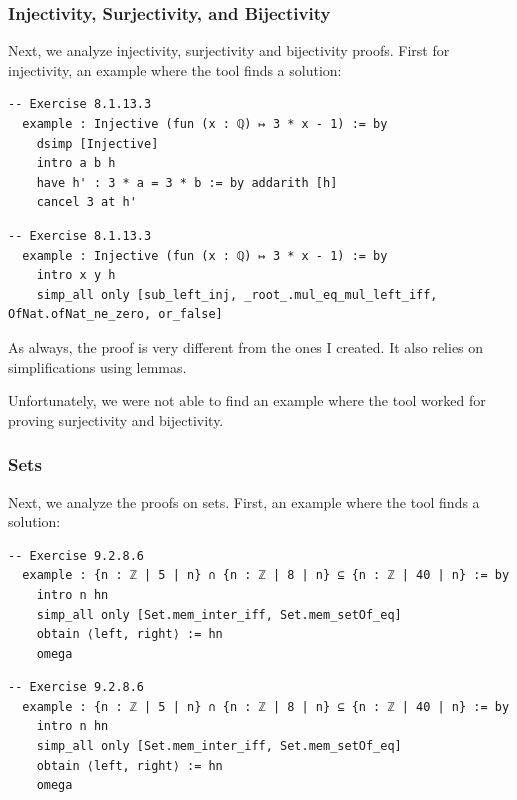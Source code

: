 \documentclass[12pt]{article}
\newcommand{\leancopilot}{\texttt{LeanCopilot} }
\begin{document}
\subsubsection{Injectivity, Surjectivity, and Bijectivity}
Next, we analyze injectivity, surjectivity and bijectivity proofs. First for injectivity, an example where the tool finds a solution:

\begin{minipage}{0.495\textwidth}
  \begin{lstlisting}[title={Human proof}]
  -- Exercise 8.1.13.3    
  example : Injective (fun (x : ℚ) ↦ 3 * x - 1) := by
    dsimp [Injective]
    intro a b h
    have h' : 3 * a = 3 * b := by addarith [h]
    cancel 3 at h'
  \end{lstlisting}
\end{minipage}
\vline
\begin{minipage}{0.495\textwidth}
  \begin{lstlisting}[title={\leancopilot proof}]
  -- Exercise 8.1.13.3 
  example : Injective (fun (x : ℚ) ↦ 3 * x - 1) := by
    intro x y h
    simp_all only [sub_left_inj, _root_.mul_eq_mul_left_iff, OfNat.ofNat_ne_zero, or_false]
  \end{lstlisting}
\end{minipage}

As always, the proof is very different from the ones I created. It also relies on simplifications using lemmas.

Unfortunately, we were not able to find an example where the tool worked for proving surjectivity and bijectivity. 

\subsubsection{Sets}
Next, we analyze the proofs on sets. First, an example where the tool finds a solution:

\begin{minipage}{0.495\textwidth}
  \begin{lstlisting}[title={Human proof}]
  -- Exercise 9.2.8.6   
  example : {n : ℤ | 5 | n} ∩ {n : ℤ | 8 | n} ⊆ {n : ℤ | 40 | n} := by
    intro n hn
    simp_all only [Set.mem_inter_iff, Set.mem_setOf_eq]
    obtain ⟨left, right⟩ := hn
    omega
  \end{lstlisting}
\end{minipage}
\vline
\begin{minipage}{0.495\textwidth}
  \begin{lstlisting}[title={\leancopilot proof}]
  -- Exercise 9.2.8.6   
  example : {n : ℤ | 5 | n} ∩ {n : ℤ | 8 | n} ⊆ {n : ℤ | 40 | n} := by
    intro n hn
    simp_all only [Set.mem_inter_iff, Set.mem_setOf_eq]
    obtain ⟨left, right⟩ := hn
    omega
  \end{lstlisting}
\end{minipage}
\end{document}
